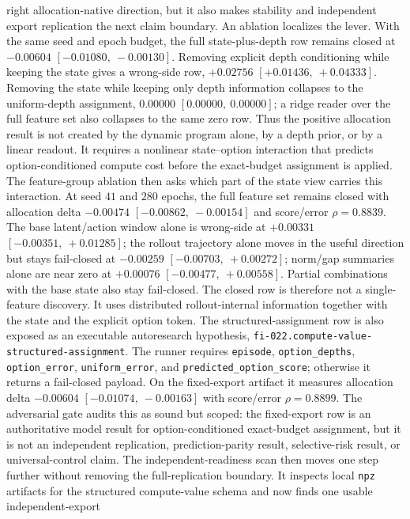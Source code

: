 right allocation-native direction, but it also makes stability and independent
export replication the next claim boundary.
An ablation localizes the lever.  With the same seed and epoch budget, the full
state-plus-depth row remains closed at $-0.00604$ $[-0.01080,\ -0.00130]$.
Removing explicit depth conditioning while keeping the state gives a wrong-side
row, $+0.02756$ $[+0.01436,\ +0.04333]$.  Removing the state while keeping only
depth information collapses to the uniform-depth assignment, $0.00000$
$[0.00000,\ 0.00000]$; a ridge reader over the full feature set also collapses
to the same zero row.  Thus the positive allocation result is not created by
the dynamic program alone, by a depth prior, or by a linear readout.  It
requires a nonlinear state--option interaction that predicts option-conditioned
compute cost before the exact-budget assignment is applied.
The feature-group ablation then asks which part of the state view carries this
interaction.  At seed $41$ and $280$ epochs, the full feature set remains
closed with allocation delta $-0.00474$ $[-0.00862,\ -0.00154]$ and
score/error $\rho=0.8839$.  The base latent/action window alone is wrong-side
at $+0.00331$ $[-0.00351,\ +0.01285]$; the rollout trajectory alone moves in
the useful direction but stays fail-closed at $-0.00259$
$[-0.00703,\ +0.00272]$; norm/gap summaries alone are near zero at $+0.00076$
$[-0.00477,\ +0.00558]$.  Partial combinations with the base state also stay
fail-closed.  The closed row is therefore not a single-feature discovery.  It
uses distributed rollout-internal information together with the state and the
explicit option token.
The structured-assignment row is also exposed as an executable autoresearch
hypothesis, \texttt{fi-022.compute-value-structured-assignment}.  The runner
requires \texttt{episode}, \texttt{option\_depths}, \texttt{option\_error},
\texttt{uniform\_error}, and \texttt{predicted\_option\_score}; otherwise it
returns a fail-closed payload.  On the fixed-export artifact it measures
allocation delta $-0.00604$ $[-0.01074,\ -0.00163]$ with score/error
$\rho=0.8899$.  The adversarial gate audits this as sound but scoped: the
fixed-export row is an authoritative model result for option-conditioned
exact-budget assignment, but it is not an independent replication,
prediction-parity result, selective-risk result, or universal-control claim.
The independent-readiness scan then moves one step further without removing
the full-replication boundary.  It inspects local \texttt{npz} artifacts for
the structured compute-value schema and now finds one usable independent-export
